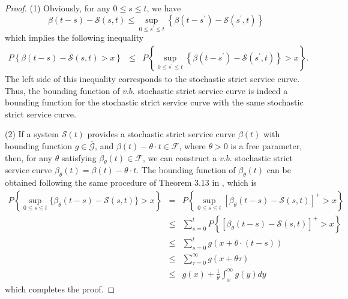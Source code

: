 \documentclass[12pt]{article}
\newtheorem{proof}{Proof}
\def \QED {\hfill \vrule height6pt width 6pt depth 0pt}
\begin{document}
\begin{proof}
(1) Obviously, for any $0\leq s\leq t$, we have
$$\beta(t-s)-\mathcal{S}(s,t)\leq \sup_{0\leq s^\prime\leq t}\left\{\beta(t-s^\prime)-\mathcal{S}(s^\prime,t)\right\}$$
which implies the following inequality
\begin{eqnarray*}
P\left\{\beta(t-s)-\mathcal{S}(s,t)>x\right\} &\leq& P\left\{\sup_{0\leq s^\prime\leq t}\left\{\beta(t-s^\prime)-\mathcal{S}(s^\prime,t)\right\}>x\right\}.
\end{eqnarray*}
The left side of this inequality corresponds to the stochastic strict service curve. Thus, the bounding function of $v.b.$ stochastic strict service curve is indeed a bounding function for the stochastic strict service curve with the same stochastic strict service curve.

(2) If a system $\mathcal{S}(t)$ provides a stochastic strict service curve $\beta(t)$ with bounding function $g\in\bar{\mathcal{G}}$, and $\beta(t)-\theta \cdot t\in\mathcal{F}$, where $\theta>0$ is a free parameter, then, for any $\theta$ satisfying $\beta_{\theta}(t)\in\mathcal{F}$, we can construct a $v.b.$ stochastic strict service curve $\beta_{\theta}(t)=\beta(t)-\theta \cdot t$. The bounding function of $\beta_\theta(t)$ can be obtained following the same procedure of Theorem 3.13 in \cite{JiangLiu-15877}, which is
\begin{eqnarray*}
P\left\{\sup_{0\leq s\leq t}\{\beta_{\theta}(t-s)-\mathcal{S}(s,t)\}>x\right\} &= &P\left\{\sup_{0\leq s\leq t}[\beta_{\theta}(t-s)-\mathcal{S}(s,t)]^+>x\right\}\\
&\leq &\sum_{s=0}^t P\left\{[\beta_{\theta}(t-s)-\mathcal{S}(s,t)]^+>x\right\}\\
&\leq &\sum_{s=0}^t g(x+\theta\cdot(t-s))\\
&\leq & \sum_{\tau=0}^\infty g(x+\theta\tau)\\
&\leq & g(x)+\frac{1}{\theta}\int_{x}^\infty g(y)dy
\end{eqnarray*}
which completes the proof.\QED
\end{proof}
\end{document}
